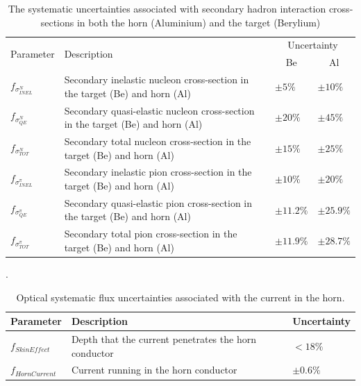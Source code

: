 \begin{table}[!h]
  \renewcommand{\arraystretch}{1.4}    
  \begin{tabular}{p{2.5cm} p{9.2cm} p{1.2cm} p{1.2cm}}
    \toprule
    \multirow{2}{*}{Parameter} & \multirow{2}{*}{Description} & \multicolumn{2}{c}{Uncertainty} \\
    && \multicolumn{1}{c}{Be} & \multicolumn{1}{c}{Al} \\
    \midrule

    $f_{\sigma_{INEL}^{N}}$   & Secondary inelastic nucleon cross-section in the target (Be) and horn (Al) & $\pm 5 \%$ & $\pm 10 \%$\\
                            
    $f_{\sigma_{QE}^{N}}$     & Secondary quasi-elastic nucleon cross-section in the target (Be) and horn (Al) & $\pm 20 \%$ & $\pm 45 \%$\\
                            
    $f_{\sigma_{TOT}^{N}}$    & Secondary total nucleon cross-section in the target (Be) and horn (Al) & $\pm 15 \%$ & $\pm 25 \%$\\

    $f_{\sigma_{INEL}^{\pi}}$ & Secondary inelastic pion cross-section in the target (Be) and horn (Al) & $\pm 10 \% $ & $\pm 20 \% $\\
                          
    $f_{\sigma_{QE}^{\pi}}$   & Secondary quasi-elastic pion cross-section in the target (Be) and horn (Al) & $\pm 11.2 \% $ & $\pm 25.9 \% $\\
                          
    $f_{\sigma_{TOT}^{\pi}}$  & Secondary total pion cross-section in the target (Be) and horn (Al) & $\pm 11.9 \%$ & $\pm 28.7 \%$\\
    \bottomrule
  \end{tabular}
  \caption[Hadronic secondary interaction flux systematic parameters]{The systematic uncertainties associated with secondary hadron interaction cross-sections in both the horn (Aluminium) and the target (Berylium) \cite{SBN_Proposal}}.
  \label{}
\end{table}


\begin{table}[!h]
  \renewcommand{\arraystretch}{1.4}    
  \begin{tabular}{p{2.5cm} p{10cm} p{2cm}}

    \toprule
    Parameter & Description & Uncertainty \\ 
    \midrule

    $f_{SkinEffect}$  & Depth that the current penetrates the horn conductor & $<18 \%$\\

    $f_{HornCurrent}$ & Current running in the horn conductor & $\pm 0.6 \%$\\
    \bottomrule

  \end{tabular}
  \caption[Optical, beam focusing flux systematic parameters]{Optical systematic flux uncertainties associated with the current in the horn\cite{BNB_flux}.}
  \label{}
\end{table}

